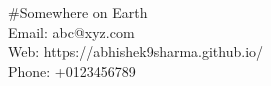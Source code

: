 \begin{minipage}[t]{0.495\textwidth}
  \#Somewhere on Earth\\
  Email: abc@xyz.com \\
  Web: https://abhishek9sharma.github.io/ \\
  Phone: +0123456789
\end{minipage}